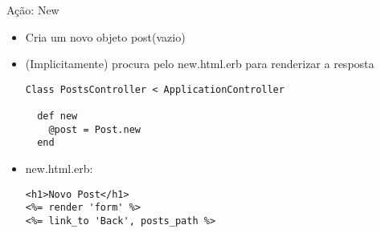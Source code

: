 \begin{frame}{Ação: New}
	\begin{itemize}
		\item Cria um novo objeto \alert{post}(vazio) 
		\item (Implicitamente) procura pelo \alert{new.html.erb} para renderizar a resposta
		\begin{lstlisting}[style=RubyInputStyle, caption=posts\_controller.rb]
Class PostsController < ApplicationController
  
  def new
    @post = Post.new 
  end 
		\end{lstlisting}		
\framebreak
		\item \alert{new.html.erb}:
		\begin{lstlisting}[style=RubyInputStyle, caption=views/posts/new.html.erbb]
<h1>Novo Post</h1>
<%= render 'form' %>
<%= link_to 'Back', posts_path %>
		\end{lstlisting}
	\end{itemize}	
\end{frame}